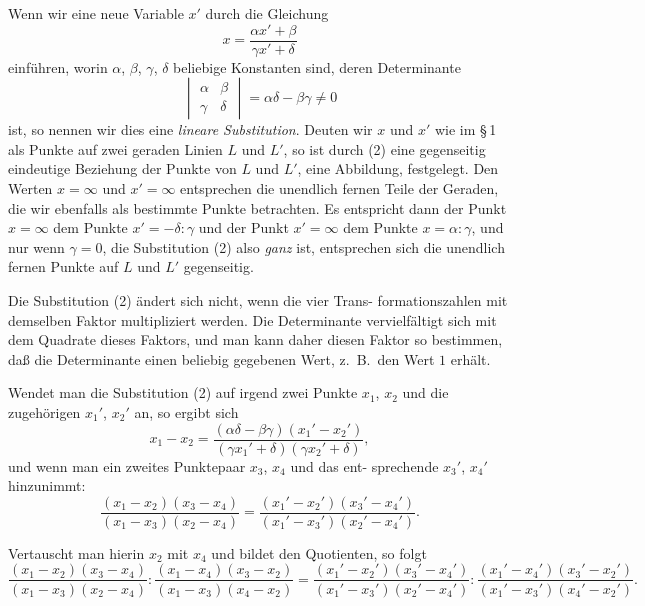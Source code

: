 \documentclass[12pt,a4paper]{book}
\theoremstyle{definition}
\begin{document}
Wenn wir eine neue Variable $x'$ durch die Gleichung
\begin{equation}
x = \frac{\alpha x' + \beta}{\gamma x' + \delta}
\end{equation}
einf\"uhren, worin $\alpha$, $\beta$, $\gamma$, $\delta$ beliebige Konstanten sind, deren
Determinante
\[
\begin{vmatrix}
\alpha & \beta\\
\gamma & \delta
\end{vmatrix}
= \alpha\delta - \beta\gamma \neq 0
\]
ist, so nennen wir dies eine \emph{lineare Substitution}. Deuten wir $x$
und $x'$ wie im \S\,1 als Punkte auf zwei geraden Linien $L$ und $L'$,
so ist durch (2) eine gegenseitig eindeutige Beziehung der
Punkte von $L$ und $L'$, eine Abbildung, festgelegt. Den Werten
$x = \infty$ und $x' = \infty$ entsprechen die unendlich fernen Teile
der Geraden, die wir ebenfalls als bestimmte Punkte betrachten.
Es entspricht dann der Punkt $x = \infty$ dem Punkte $x' = -\delta:\gamma$
und der Punkt $x' = \infty$ dem Punkte $x = \alpha:\gamma$, und nur wenn $\gamma = 0$,
die Substitution (2) also \emph{ganz} ist, entsprechen sich die unendlich
fernen Punkte auf $L$ und $L'$ gegenseitig.

Die Substitution (2) \"andert sich nicht, wenn die vier Trans-
formationszahlen mit demselben Faktor multipliziert werden. Die
Determinante vervielf\"altigt sich mit dem Quadrate dieses
Faktors, und man kann daher diesen Faktor so bestimmen, da\ss
die Determinante einen beliebig gegebenen Wert, z.~B.\ den Wert $1$
erh\"alt.

Wendet man die Substitution (2) auf irgend zwei Punkte $x_1$, $x_2$
und die zugeh\"origen $x_1'$, $x_2'$ an, so ergibt sich
\[
x_1 - x_2 = \frac{(\alpha\delta - \beta\gamma)(x_1' - x_2')}{(\gamma x_1' + \delta)(\gamma x_2' + \delta)},
\]
und wenn man ein zweites Punktepaar $x_3$, $x_4$ und das ent-
sprechende $x_3'$, $x_4'$ hinzunimmt:
\[
\frac{(x_1 - x_2)(x_3 - x_4)}{(x_1 - x_3)(x_2 - x_4)} = \frac{(x_1' - x_2')(x_3' - x_4')}{(x_1' - x_3')(x_2' - x_4')}.
\]

Vertauscht man hierin $x_2$ mit $x_4$ und bildet den Quotienten, so folgt
\begin{equation}
\frac{(x_1 - x_2)(x_3 - x_4)}{(x_1 - x_3)(x_2 - x_4)} : \frac{(x_1 - x_4)(x_3 - x_2)}{(x_1 - x_3)(x_4 - x_2)} = \frac{(x_1' - x_2')(x_3' - x_4')}{(x_1' - x_3')(x_2' - x_4')} : \frac{(x_1' - x_4')(x_3' - x_2')}{(x_1' - x_3')(x_4' - x_2')}.
\end{equation}
\end{document}

